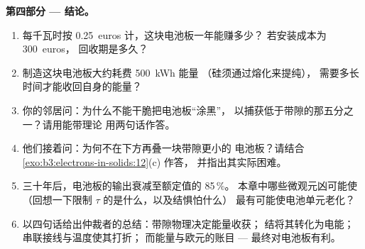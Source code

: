 \begin{problem}
\medskip\noindent\textbf{第四部分 --- 结论。}

\begin{enumerate}[resume]
  \item 每千瓦时按 \qty{0.25}{euros} 计，这块电池板一年能赚多少？
        若安装成本为 \qty{300}{euros}，
        回收期是多久？
  \item 制造这块电池板大约耗费 \qty{500}{kWh} 能量
        （硅须通过熔化来提纯），
        需要多长时间才能收回自身的能量？
  \item 你的邻居问：为什么不能干脆把电池板“涂黑”，
        以捕获低于带隙的那五分之一？请用能带理论
        用两句话作答。
  \item 他们接着问：为何不在下方再叠一块带隙更小的
        电池板？请结合
        \cref{exo:b3:electrons-in-solids:12}(c) 作答，
        并指出其实际困难。
  \item 三十年后，电池板的输出衰减至额定值的 85\,\%。
        本章中哪些微观元凶可能使
        （回想一下限制 $\tau$ 的是什么，以及结惧怕什么）
        最有可能使电池单元老化？
  \item 以四句话给出仲裁者的总结：带隙物理决定能量收获；
        结将其转化为电能；串联接线与温度使其打折；
        而能量与欧元的账目 --- 
        最终对电池板有利。
\end{enumerate}
\end{problem}

